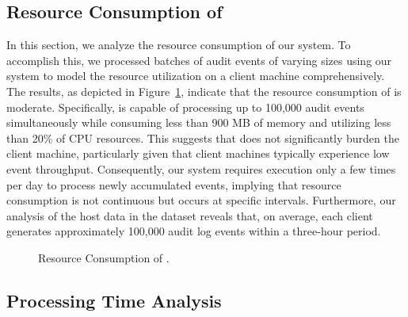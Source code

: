  \subsection*{Resource Consumption of \Sys}

 In this section, we analyze the resource consumption of our system. To accomplish this, we processed batches of audit events of varying sizes using our system to model the resource utilization on a client machine comprehensively. The results, as depicted in Figure~\ref{fig:resource}, indicate that the resource consumption of \Sys is moderate. Specifically, \Sys is capable of processing up to 100,000 audit events simultaneously while consuming less than 900 MB of memory and utilizing less than 20\% of CPU resources. This suggests that \Sys does not significantly burden the client machine, particularly given that client machines typically experience low event throughput. Consequently, our system requires execution only a few times per day to process newly accumulated events, implying that resource consumption is not continuous but occurs at specific intervals. Furthermore, our analysis of the host data in the \optc dataset reveals that, on average, each client generates approximately 100,000 audit log events within a three-hour period.

 \begin{figure}[t!]
  \centering
  \hfill
  \hfill
  \caption{Resource Consumption of \Sys.}
  \label{fig:resource}
  \vspace{-2ex}
\end{figure}

 \subsection*{Processing Time Analysis}

